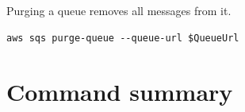 \documentclass{pgnotes}
\begin{document}
Purging a queue removes all messages from it.

\begin{verbatim}
aws sqs purge-queue --queue-url $QueueUrl
\end{verbatim}



\section{Command summary}

\inputminted{powershell}{sqs_commands.ps1}
\end{document}

